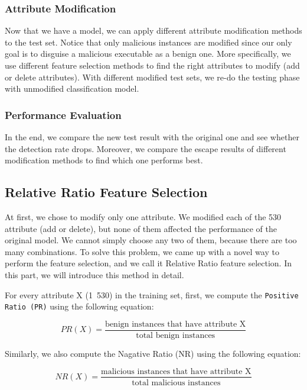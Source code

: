 \documentclass[11pt]{article}
\begin{document}
\subsubsection{Attribute Modification}
Now that we have a model, we can apply different attribute modification methods to the test set. Notice that only malicious instances are modified since our only goal is to disguise a malicious executable as a benign one. More specifically, we use different feature selection methods to find the right attributes to modify (add or delete attributes). With different modified test sets, we re-do the testing phase with unmodified classification model. 

\subsubsection{Performance Evaluation}
In the end, we compare the new test result with the original one and see whether the detection rate drops. Moreover, we compare the escape results of different modification methods to find which one performs best. 

\subsection{Relative Ratio Feature Selection}
At first, we chose to modify only one attribute. We modified each of the 530 attribute (add or delete), but none of them affected the performance of the original model. We cannot simply choose any two of them, because there are too many combinations. To solve this problem, we came up with a novel way to perform the feature selection, and we call it Relative Ratio feature selection. In this part, we will introduce this method in detail.

For every attribute X (1~530) in the training set, first, we compute the \texttt{Positive Ratio (PR)} using the following equation:

\begin{equation}
PR(X) = \frac{\text{benign instances that have attribute X}}{\text{total benign instances}}
\end{equation}

Similarly, we also compute the Nagative Ratio (NR) using the following equation:

\begin{equation}
NR(X) = \frac{\text{malicious instances that have attribute X}}{\text{total malicious instances}}
\end{equation}
\end{document}
